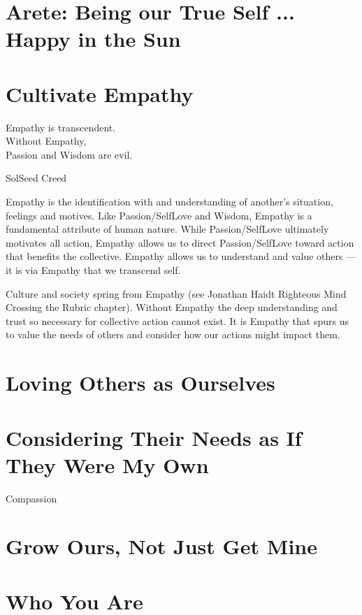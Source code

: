 \documentclass[ebook,12pt,openany,twoside]{memoir}
\newcommand{\tab}{\hspace*{2em}}
\newcommand{\imagefacingchapter}[1]{
  \cleartoverso
  \clearpage \null
  \thispagestyle{cleared}
  \AddToShipoutPictureBG*{%
    \AtStockLowerLeft{%
      \texttt{[image: \#1]}
    }
  }
  \clearpage
}
\begin{document}
\chapter{Arete: Being our True Self ... Happy in the Sun}


\chapter{Cultivate Empathy}

\setlength\epigraphwidth{2.8in}
\epigraph{
  Empathy is transcendent.\\
  Without Empathy,\\
  \tab Passion and Wisdom are evil.
}{SolSeed Creed}

Empathy is the identification with and understanding of another's situation,
feelings and motives. Like Passion/SelfLove and Wisdom, Empathy is a
fundamental attribute of human nature. While Passion/SelfLove ultimately
motivates all action, Empathy allows us to direct Passion/SelfLove toward
action that benefits the collective. Empathy allows us to understand and
value others --- it is via Empathy that we transcend self.

Culture and society spring from Empathy (see Jonathan Haidt Righteous Mind
Crossing the Rubric chapter). Without Empathy the deep understanding and trust
so necessary for collective action cannot exist. It is Empathy that spurs us to
value the needs of others and consider how our actions might impact them.

\chapter{Loving Others as Ourselves}

\chapter{Considering Their Needs as If They Were My Own}

Compassion

\chapter{Grow Ours, Not Just Get Mine}

\imagefacingchapter{images/RayOfSummerSun-cropped}
\chapter{Who You Are}
\end{document}
